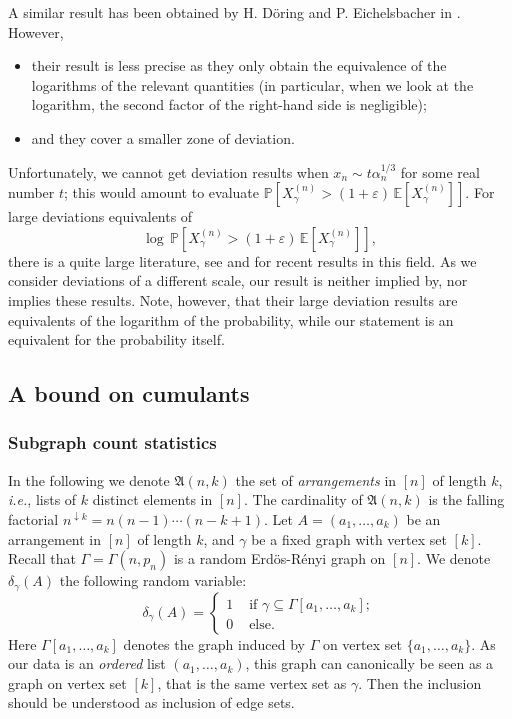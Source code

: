 \documentclass[12pt,a4paper,reqno]{amsart}
\theoremstyle{remark}
\newcommand{\esper}{\mathbb{E}}
\newcommand{\proba}{\mathbb{P}}
\newcommand{\alphan}{\alpha_n}
\newcommand{\SubGraph}{X^{(n)}}
\newcommand{\fall}[1]{^{\downarrow #1}}
\newcommand{\arr}{\mathfrak{A}}
\begin{document}
A similar result has been obtained by H. D\"{o}ring and P. Eichelsbacher in \cite[Theorem 2.3]{DE12}. However, \vspace{2mm}
\begin{itemize}
    \item their result is less precise as they only obtain the equivalence of the logarithms of the relevant quantities (in particular, when we look at the logarithm, the second factor of the right-hand side is negligible);\vspace{2mm}
    \item and they cover a smaller zone of deviation.\vspace{2mm}
\end{itemize}
Unfortunately, we cannot get deviation results when $x_n \sim t \alphan^{1/3}$ for some real number $t$;
this would amount to evaluate $\proba [\SubGraph_\gamma > (1+\varepsilon)\,\esper[\SubGraph_\gamma]]$. For large deviations equivalents of
$$ \log \, \proba [\SubGraph_\gamma >  (1+\varepsilon)\,\esper[\SubGraph_\gamma]], $$
there is a quite large literature, see \cite[Theorem 4.1]{CV11} and \cite{Cha12} for recent results in this field. As we consider deviations of a different scale, our result is neither implied by, nor implies these results. Note, however, that their large deviation results are equivalents of the logarithm of the probability, while our statement is an equivalent for the probability itself.
\bigskip



\subsection{A bound on cumulants}
\subsubsection{Subgraph count statistics}
In the following we denote $\arr(n,k)$ the set of \emph{arrangements} in $[n]$ of length $k$, \emph{i.e.}, lists of $k$ distinct elements in $[n]$. 
The cardinality of $\arr(n,k)$ is  the falling factorial 
$n\fall{k}=n(n-1) \cdots (n-k+1)$.
Let $A=(a_1,\dots,a_k)$ be an arrangement in $[n]$ of length $k$, and $\gamma$ be a fixed graph with vertex set $[k]$. Recall that $\Gamma=\Gamma(n,p_{n})$ is a random Erd\"os-R\'enyi graph on $[n]$. We denote $\delta_\gamma(A)$ the following random variable:
\begin{equation}\delta_\gamma(A) = \begin{cases}
     1 & \text{ if }\gamma \subseteq \Gamma[a_1,\dots,a_k];\\
     0 & \text{ else.}
\end{cases}\label{eq:deltadef}
\end{equation}
Here $\Gamma[a_1,\dots,a_k]$ denotes the graph induced by $\Gamma$ on vertex set $\{a_1,\dots,a_k\}$.
As our data is an {\em ordered} list $(a_1,\dots,a_k)$, this graph can canonically be seen as a graph on vertex set $[k]$, that is the same vertex set as $\gamma$. Then the inclusion should be understood as inclusion of edge sets.\medskip
\end{document}
